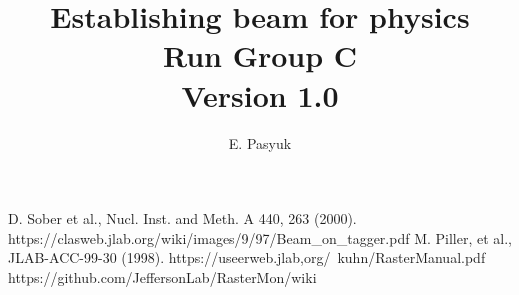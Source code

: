 \documentclass[12pt]{article}
\newcommand{\versionnumber}{1.0}
\begin{document}
\title{Establishing beam for physics \\
Run Group C\\\normalsize \vspace{3mm} Version \versionnumber}
\author{E. Pasyuk}
\maketitle


\begin{thebibliography}{00}
 D. Sober et al., Nucl. Inst. and Meth. A 440, 263 (2000).
 https://clasweb.jlab.org/wiki/images/9/97/Beam\_on\_tagger.pdf
 M. Piller, et al., JLAB-ACC-99-30 (1998).
 https://useerweb.jlab,org/~kuhn/RasterManual.pdf
 https://github.com/JeffersonLab/RasterMon/wiki

\end{thebibliography}
\end{document}
